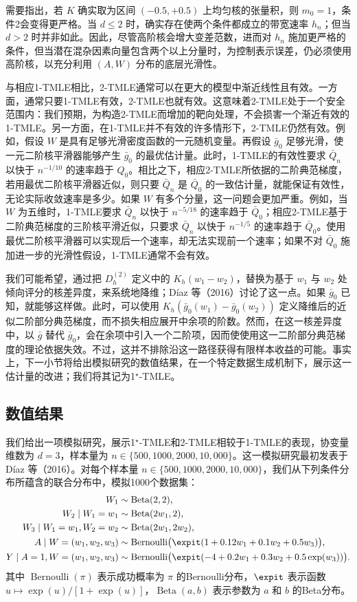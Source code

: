 需要指出，若 $K$ 确实取为区间 $(-0.5,+0.5)$ 上均匀核的张量积，则 $m_0=1$，条件2会变得更严格。当 $d\le2$ 时，确实存在使两个条件都成立的带宽速率 $h_n$；但当 $d>2$ 时并非如此。因此，尽管高阶核会增大变差范数，进而对 $h_n$ 施加更严格的条件，但当潜在混杂因素向量包含两个以上分量时，为控制表示误差，仍必须使用高阶核，以充分利用 $(A,W)$ 分布的底层光滑性。

与相应1-TMLE相比，2-TMLE通常可以在更大的模型中渐近线性且有效。一方面，通常只要1-TMLE有效，2-TMLE也就有效。这意味着2-TMLE处于一个安全范围内：我们预期，为构造2-TMLE而增加的靶向处理，不会损害一个渐近有效的1-TMLE。另一方面，在1-TMLE并不有效的许多情形下，2-TMLE仍然有效。例如，假设 $W$ 是具有足够光滑密度函数的一元随机变量。再假设 $\bar g_0$ 足够光滑，使一元二阶核平滑器能够产生 $\bar g_0$ 的最优估计量。此时，1-TMLE的有效性要求 $\bar Q_n$ 以快于 $n^{-1/10}$ 的速率趋于 $Q_0$。相比之下，相应2-TMLE所依据的二阶典范梯度，若用最优二阶核平滑器近似，则只要 $\bar Q_n$ 是 $\bar Q_0$ 的一致估计量，就能保证有效性，无论实际收敛速率是多少。如果 $W$ 有多个分量，这一问题会更加严重。例如，当 $W$ 为五维时，1-TMLE要求 $\bar Q_n$ 以快于 $n^{-5/18}$ 的速率趋于 $\bar Q_0$；相应2-TMLE基于二阶典范梯度的三阶核平滑近似，只要求 $\bar Q_n$ 以快于 $n^{-1/5}$ 的速率趋于 $\bar Q_0$。使用最优二阶核平滑器可以实现后一个速率，却无法实现前一个速率；如果不对 $\bar Q_0$ 施加进一步的光滑性假设，1-TMLE通常不会有效。

我们可能希望，通过把 $D_h^{(2)}$ 定义中的 $K_h(w_1-w_2)$，替换为基于 $w_1$ 与 $w_2$ 处倾向评分的核差异度，来系统地降维；Díaz 等（2016）讨论了这一点。如果 $\bar g_0$ 已知，就能够这样做。此时，可以使用 $K_h(\bar g_0(w_1)-\bar g_0(w_2))$ 定义降维后的近似二阶部分典范梯度，而不损失相应展开中余项的阶数。然而，在这一核差异度中，以 $\bar g$ 替代 $\bar g_0$，会在余项中引入一个二阶项，因而使使用这一二阶部分典范梯度的理论依据失效。不过，这并不排除沿这一路径获得有限样本收益的可能。事实上，下一小节将给出模拟研究的数值结果，在一个特定数据生成机制下，展示这一估计量的改进；我们将其记为1$^\star$-TMLE。

\subsection{数值结果}

我们给出一项模拟研究，展示1$^\star$-TMLE和2-TMLE相较于1-TMLE的表现，协变量维数为 $d=3$，样本量为 $n\in\{500,1000,2000,10{,}000\}$。这一模拟研究最初发表于 Díaz 等（2016）。对每个样本量 $n\in\{500,1000,2000,10{,}000\}$，我们从下列条件分布所蕴含的联合分布中，模拟1000个数据集：
\[
\begin{aligned}
W_1&\sim\operatorname{Beta}(2,2),\\
W_2\mid W_1=w_1&\sim\operatorname{Beta}(2w_1,2),\\
W_3\mid W_1=w_1,W_2=w_2&\sim\operatorname{Beta}(2w_1,2w_2),\\
A\mid W=(w_1,w_2,w_3)&\sim\operatorname{Bernoulli}\bigl(\expit(1+0.12w_1+0.1w_2+0.5w_3)\bigr),\\
Y\mid A=1,W=(w_1,w_2,w_3)&\sim\operatorname{Bernoulli}\bigl(\expit(-4+0.2w_1+0.3w_2+0.5\exp(w_3))\bigr).
\end{aligned}
\]
其中 $\operatorname{Bernoulli}(\pi)$ 表示成功概率为 $\pi$ 的Bernoulli分布，$\expit$ 表示函数 $u\mapsto\exp(u)/[1+\exp(u)]$，$\operatorname{Beta}(a,b)$ 表示参数为 $a$ 和 $b$ 的Beta分布。

